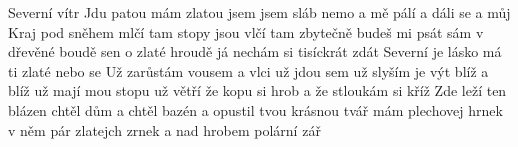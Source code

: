 \begin{TEXT}{Severní vítr}
\SLOKA Jdu  patou mám  zlatou \NL
jsem  jsem sláb nemo \NL
a  mě pálí a  dáli \NL
se a  můj    
\SLOKA Kraj pod sněhem mlčí tam stopy jsou vlčí \NL
tam zbytečně budeš mi psát \NL
sám v dřevěné boudě sen o zlaté hroudě \NL
já nechám si tisíckrát zdát 
\REFREN  Severní  je   lásko má  \NL
{} ti  zlaté  nebo se   
\SLOKA Už zarůstám vousem a vlci už jdou sem \NL
už slyším je výt blíž a blíž \NL
už mají mou stopu už větří že kopu \NL
si hrob a že stloukám si kříž 
\SLOKA Zde leží ten blázen chtěl dům a chtěl bazén \NL
a opustil tvou krásnou tvář \NL
mám plechovej hrnek v něm pár zlatejch zrnek \NL
a nad hrobem polární zář \NL
\end{TEXT}
